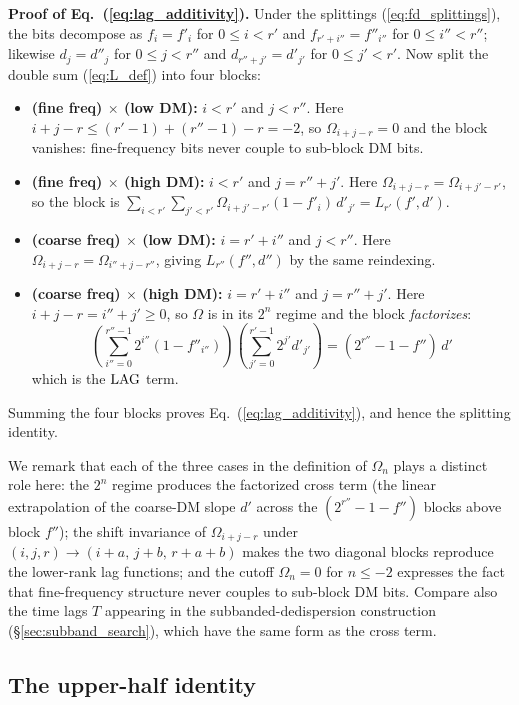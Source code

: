 \documentclass{article}
\numberwithin{equation}{section}   %
\def\LAG{{\rm LAG}}
\begin{document}
\par\noindent
{\bf Proof of Eq.\ (\ref{eq:lag_additivity}).}
Under the splittings (\ref{eq:fd_splittings}), the bits decompose as $f_i = f'_i$ for
$0 \le i < r'$ and $f_{r'+i''} = f''_{i''}$ for $0 \le i'' < r''$; likewise $d_j = d''_j$ for
$0 \le j < r''$ and $d_{r''+j'} = d'_{j'}$ for $0 \le j' < r'$. Now split the double sum
(\ref{eq:L_def}) into four blocks:
\begin{itemize}
\item {\bf (fine freq) $\times$ (low DM):} $i < r'$ and $j < r''$. Here
$i+j-r \le (r'-1) + (r''-1) - r = -2$, so $\Omega_{i+j-r} = 0$ and the block vanishes:
fine-frequency bits never couple to sub-block DM bits.
\item {\bf (fine freq) $\times$ (high DM):} $i < r'$ and $j = r''+j'$. Here
$\Omega_{i+j-r} = \Omega_{i+j'-r'}$, so the block is
$\sum_{i<r'} \sum_{j'<r'} \Omega_{i+j'-r'} (1-f'_i)\, d'_{j'} = L_{r'}(f', d')$.
\item {\bf (coarse freq) $\times$ (low DM):} $i = r'+i''$ and $j < r''$. Here
$\Omega_{i+j-r} = \Omega_{i''+j-r''}$, giving $L_{r''}(f'', d'')$ by the same reindexing.
\item {\bf (coarse freq) $\times$ (high DM):} $i = r'+i''$ and $j = r''+j'$. Here
$i+j-r = i''+j' \ge 0$, so $\Omega$ is in its $2^n$ regime and the block {\em factorizes}:
\begin{equation}
\left( \sum_{i''=0}^{r''-1} 2^{i''} (1 - f''_{i''}) \right)
\left( \sum_{j'=0}^{r'-1} 2^{j'} d'_{j'} \right)
 = (2^{r''} - 1 - f'') \, d'
\end{equation}
which is the $\LAG$ term.
\end{itemize}
Summing the four blocks proves Eq.\ (\ref{eq:lag_additivity}), and hence the splitting
identity.

We remark that each of the three cases in the definition of $\Omega_n$ plays a distinct role
here: the $2^n$ regime produces the factorized cross term (the linear extrapolation of the
coarse-DM slope $d'$ across the $(2^{r''}-1-f'')$ blocks above block $f''$); the shift
invariance of $\Omega_{i+j-r}$ under $(i,j,r) \to (i+a,\, j+b,\, r+a+b)$ makes the two diagonal
blocks reproduce the lower-rank lag functions; and the cutoff $\Omega_n = 0$ for $n \le -2$
expresses the fact that fine-frequency structure never couples to sub-block DM bits. Compare
also the time lags $T$ appearing in the subbanded-dedispersion construction
(\S\ref{sec:subband_search}), which have the same form as the cross term.

\subsection{The upper-half identity}
\label{app:upper_half_proof}
\end{document}
